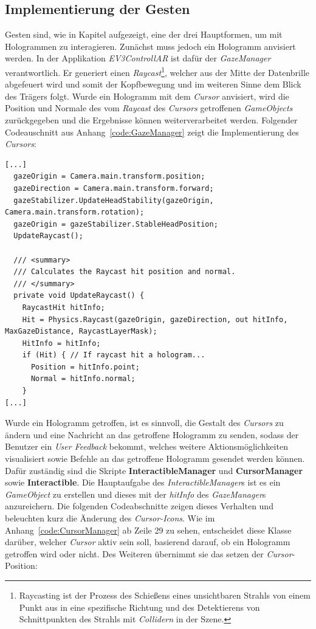 \subsection{Implementierung der Gesten}\label{ssec:gestureCommands}
Gesten sind, wie in Kapitel aufgezeigt, eine der drei Hauptformen, um mit Hologrammen zu interagieren. Zunächst muss jedoch ein Hologramm anvisiert werden. In der Applikation \textit{EV3ControllAR} ist dafür der \textit{GazeManager} verantwortlich. Er generiert einen \textit{Raycast}\footnote{ Raycasting ist der Prozess des Schießens eines unsichtbaren Strahls von einem Punkt aus in eine spezifische Richtung und des Detektierens von Schnittpunkten des Strahls mit \textit{Collidern} in der Szene.}, welcher aus der Mitte der Datenbrille abgefeuert wird und somit der Kopfbewegung und im weiteren Sinne dem Blick des Trägers folgt. Wurde ein Hologramm mit dem \textit{Cursor} anvisiert, wird die Position und Normale des vom \textit{Raycast} des \textit{Cursors} getroffenen \textit{GameObjects} zurückgegeben und die Ergebnisse können weiterverarbeitet werden. Folgender Codeauschnitt aus Anhang~\ref{code:GazeManager} zeigt die Implementierung des \textit{Cursors}:
\begin{lstlisting}
[...]
  gazeOrigin = Camera.main.transform.position;
  gazeDirection = Camera.main.transform.forward;
  gazeStabilizer.UpdateHeadStability(gazeOrigin, Camera.main.transform.rotation);
  gazeOrigin = gazeStabilizer.StableHeadPosition;
  UpdateRaycast();
			
  /// <summary>
  /// Calculates the Raycast hit position and normal.
  /// </summary>         
  private void UpdateRaycast() {
	RaycastHit hitInfo;
	Hit = Physics.Raycast(gazeOrigin, gazeDirection, out hitInfo, MaxGazeDistance, RaycastLayerMask);
	HitInfo = hitInfo;
	if (Hit) { // If raycast hit a hologram...
	  Position = hitInfo.point;
	  Normal = hitInfo.normal;
	}
[...]
\end{lstlisting}
Wurde ein Hologramm getroffen, ist es sinnvoll, die Gestalt des \textit{Cursors} zu ändern und eine Nachricht an das getroffene Hologramm zu senden, sodass der Benutzer ein \textit{User Feedback} bekommt, welches weitere Aktionsmöglichkeiten visualisiert sowie Befehle an das getroffene Hologramm gesendet werden können. Dafür zuständig sind die Skripte \textbf{InteractibleManager} und \textbf{CursorManager} sowie \textbf{Interactible}. Die Hauptaufgabe des \textit{InteractibleManager}s ist es ein \textit{GameObject} zu erstellen und dieses mit der \textit{hitInfo} des \textit{GazeManager}s anzureichern. Die folgenden Codeabschnitte zeigen dieses Verhalten und beleuchten kurz die Änderung des \textit{Cursor-Icons}. Wie im Anhang~\ref{code:CursorManager} ab Zeile 29 zu sehen, entscheidet diese Klasse darüber, welcher \textit{Cursor} aktiv sein soll, basierend darauf, ob ein Hologramm getroffen wird oder nicht. Des Weiteren übernimmt sie das setzen der \textit{Cursor}-Position:
